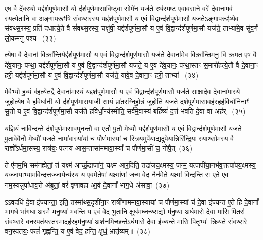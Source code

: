 {\anuvakamend[{च॒न्द्रमा॒ द्वे दे॑वलो॒कमे॒व यद्य॒ज्ञं प॑ल्पूलयेयुः॒ षट्च॑}]}%

ए॒ष वै दे॑वर॒थो यद्द॑र्\mbox{}श\-पूर्ण\-मा॒सौ यो द॑र्\mbox{}शपूर्णमा॒सावि॒ष्ट्वा सोमे॑न॒ यज॑ते॒ रथ॑स्पष्ट ए॒वाव॒साने॒ वरे॑ दे॒वाना॒मव॑ स्यत्ये॒तानि॒ वा अङ्गा॒परूꣳ॑षि संवथ्स॒रस्य॒ यद्द॑र्\mbox{}श\-पूर्ण\-मा॒सौ य ए॒वं वि॒द्वान्द॑र्\mbox{}शपूर्णमा॒सौ यज॒ते\-ऽङ्गा॒परूꣴ॑ष्ये॒व सं॑वथ्स॒रस्य॒ प्रति॑ दधात्ये॒ते वै सं॑वथ्स॒रस्य॒ चक्षु॑षी॒ यद्द॑र्\mbox{}श\-पूर्ण\-मा॒सौ य ए॒वं वि॒द्वान्द॑र्\mbox{}शपूर्णमा॒सौ यज॑ते॒ ताभ्या॑मे॒व सु॑व॒र्गं लो॒कमनु॑ \mbox{पश्य-~(३३)}

त्ये॒षा वै दे॒वानां॒ विक्रा᳚न्ति॒र्यद्द॑र्\mbox{}श\-पूर्ण\-मा॒सौ य ए॒वं वि॒द्वान्द॑र्\mbox{}शपूर्णमा॒सौ यज॑ते दे॒वाना॑मे॒व विक्रा᳚न्ति॒मनु॒ वि क्र॑मत ए॒ष वै दे॑व॒यानः॒ पन्था॒ यद्द॑र्\mbox{}श\-पूर्ण\-मा॒सौ य ए॒वं वि॒द्वान्द॑र्\mbox{}शपूर्णमा॒सौ यज॑ते॒ य ए॒व दे॑व॒यानः॒ पन्था॒स्तꣳ स॒मारो॑हत्ये॒तौ वै दे॒वाना॒ꣳ॒ हरी॒ यद्द॑र्\mbox{}श\-पूर्ण\-मा॒सौ य ए॒वं वि॒द्वान्द॑र्\mbox{}शपूर्णमा॒सौ यज॑ते॒ यावे॒व दे॒वाना॒ꣳ॒ हरी॒ ताभ्या॑-~(३४)

मे॒वैभ्यो॑ ह॒व्यं व॑हत्ये॒तद्वै दे॒वाना॑मा॒स्यं॑ यद्द॑र्\mbox{}श\-पूर्ण\-मा॒सौ य ए॒वं वि॒द्वान्द॑र्\mbox{}शपूर्णमा॒सौ यज॑ते सा॒क्षादे॒व दे॒वाना॑मा॒स्ये॑ जुहोत्ये॒ष वै ह॑विर्धा॒नी यो द॑र्\mbox{}शपूर्णमासया॒जी सा॒यं प्रा॑तरग्निहो॒त्रं जु॑होति॒ यज॑ते दर्\mbox{}श\-पूर्ण\-मा॒सावह॑रहर्\mbox{}हविर्धा॒निनाꣳ॑ सु॒तो य ए॒वं वि॒द्वान्द॑र्\mbox{}शपूर्णमा॒सौ यज॑ते हविर्धा॒न्य॑स्मीति॒ सर्व॑मे॒वास्य॑ बर्\mbox{}हि॒ष्यं॑ द॒त्तं भ॑वति दे॒वा वा अह॑र्-~(३५)

य॒ज्ञियं॒ नावि॑न्द॒न्ते द॑र्\mbox{}शपूर्णमा॒साव॑पुन॒न्तौ वा ए॒तौ पू॒तौ मेध्यौ॒ यद्द॑र्\mbox{}श\-पूर्ण\-मा॒सौ य ए॒वं वि॒द्वान्द॑र्\mbox{}शपूर्णमा॒सौ यज॑ते पू॒तावे॒वैनौ॒ मेध्यौ॑ यजते॒ नामा॑वा॒स्या॑यां च पौर्णमा॒स्यां च॒ स्त्रिय॒मुपे॑या॒द्यदु॑पे॒यान्निरि॑न्द्रियः स्या॒थ्सोम॑स्य॒ वै राज्ञो᳚\-ऽर्धमा॒सस्य॒ रात्र॑यः॒ पत्न॑य आस॒न्तासा॑ममावा॒स्यां᳚ च पौर्णमा॒सीं च॒ नोपै॒त्~(३६)

ते ए॑नम॒भि सम॑नह्येतां॒ तं यक्ष्म॑ आर्च्छ॒द्राजा॑नं॒ यक्ष्म॑ आर॒दिति॒ तद्रा॑जय॒क्ष्मस्य॒ जन्म॒ यत्पापी॑या॒नभ॑व॒त्त\-त्पा॑पय॒क्ष्मस्य॒ यज्जा॒याभ्या॒मवि॑न्द॒त्तज्जा॒येन्य॑स्य॒ य ए॒वमे॒तेषां॒ यक्ष्मा॑णां॒ जन्म॒ वेद॒ नैन॑मे॒ते यक्ष्मा॑ विन्दन्ति॒ स ए॒ते ए॒व न॑म॒स्यन्नुपा॑धाव॒त्ते अ॑ब्रूतां॒ वरं॑ वृणावहा आ॒वं दे॒वानां᳚ भाग॒धे अ॑सावा॒~(३७)

ऽऽवदधि॑ दे॒वा इ॑ज्यान्ता॒ इति॒ तस्मा᳚थ्स॒दृशी॑ना॒ꣳ॒ रात्री॑णाममावा॒स्या॑यां च पौर्णमा॒स्यां च॑ दे॒वा इ॑ज्यन्त ए॒ते हि दे॒वानां᳚ भाग॒धे भा॑ग॒धा अ॑स्मै मनु॒ष्या॑ भवन्ति॒ य ए॒वं वेद॑ भू॒तानि॒ क्षुध॑मघ्नन्थ्स॒द्यो म॑नु॒ष्या॑ अर्धमा॒से दे॒वा मा॒सि पि॒तरः॑ संवथ्स॒रे वन॒स्पत॑य॒स्तस्मा॒दह॑रहर्मनु॒ष्या॑ अश॑नमिच्छन्ते\-ऽर्धमा॒से दे॒वा इ॑ज्यन्ते मा॒सि पि॒तृभ्यः॑ क्रियते संवथ्स॒रे वन॒स्पत॑यः॒ फलं॑ गृह्णन्ति॒ य ए॒वं वेद॒ हन्ति॒ क्षुधं॒ भ्रातृ॑व्यम्॥~(३८)

